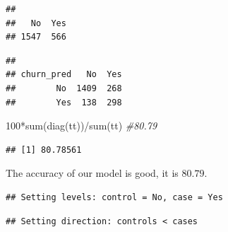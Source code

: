 \documentclass[
  twoside]{article}
\newenvironment{Shaded}{\begin{snugshade}}{\end{snugshade}}
\newcommand{\CommentTok}[1]{\textcolor[rgb]{0.56,0.35,0.01}{\textit{#1}}}
\newcommand{\DecValTok}[1]{\textcolor[rgb]{0.00,0.00,0.81}{#1}}
\newcommand{\FunctionTok}[1]{\textcolor[rgb]{0.00,0.00,0.00}{#1}}
\newcommand{\NormalTok}[1]{#1}
\newcommand{\OtherTok}[1]{\textcolor[rgb]{0.56,0.35,0.01}{#1}}
\newcommand{\SpecialCharTok}[1]{\textcolor[rgb]{0.00,0.00,0.00}{#1}}
\begin{document}
\begin{verbatim}
## 
##   No  Yes 
## 1547  566
\end{verbatim}

\begin{Shaded}
\end{Shaded}

\begin{verbatim}
##           
## churn_pred   No  Yes
##        No  1409  268
##        Yes  138  298
\end{verbatim}

\begin{Shaded}
\begin{Highlighting}[]
\DecValTok{100}\SpecialCharTok{*}\FunctionTok{sum}\NormalTok{(}\FunctionTok{diag}\NormalTok{(tt))}\SpecialCharTok{/}\FunctionTok{sum}\NormalTok{(tt) }\CommentTok{\#80.79}
\end{Highlighting}
\end{Shaded}

\begin{verbatim}
## [1] 80.78561
\end{verbatim}

The accuracy of our model is good, it is \(80.79%
\).

\begin{Shaded}
\end{Shaded}

\begin{verbatim}
## Setting levels: control = No, case = Yes
\end{verbatim}

\begin{verbatim}
## Setting direction: controls < cases
\end{verbatim}
\end{document}
